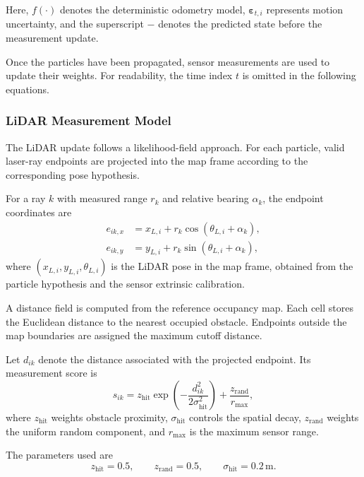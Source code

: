 \documentclass[a4paper,11pt,oneside]{book}
\begin{document}
Here, $f(\cdot)$ denotes the deterministic odometry model,
$\boldsymbol{\varepsilon}_{t,i}$ represents motion uncertainty,
and the superscript $-$ denotes the predicted state before
the measurement update.

Once the particles have been propagated, sensor measurements
are used to update their weights. For readability, the time
index $t$ is omitted in the following equations.

\subsubsection{LiDAR Measurement Model}

The LiDAR update follows a likelihood-field approach. For each
particle, valid laser-ray endpoints are projected into the map
frame according to the corresponding pose hypothesis.

For a ray $k$ with measured range $r_k$ and relative bearing
$\alpha_k$, the endpoint coordinates are
\begin{align}
    e_{ik,x}
    &=
    x_{L,i}
    +
    r_k\cos\left(\theta_{L,i}+\alpha_k\right), \\
    e_{ik,y}
    &=
    y_{L,i}
    +
    r_k\sin\left(\theta_{L,i}+\alpha_k\right),
\end{align}
where $(x_{L,i},y_{L,i},\theta_{L,i})$ is the LiDAR pose in the
map frame, obtained from the particle hypothesis and the
sensor extrinsic calibration.

A distance field is computed from the reference occupancy map.
Each cell stores the Euclidean distance to the nearest occupied
obstacle. Endpoints outside the map boundaries are assigned
the maximum cutoff distance.

Let $d_{ik}$ denote the distance associated with the projected
endpoint. Its measurement score is
\begin{equation}
    s_{ik}
    =
    z_{\mathrm{hit}}
    \exp\left(
        -\frac{d_{ik}^{2}}{2\sigma_{\mathrm{hit}}^{2}}
    \right)
    +
    \frac{z_{\mathrm{rand}}}{r_{\max}},
    \label{eq:lidar_measurement_score}
\end{equation}
where $z_{\mathrm{hit}}$ weights obstacle proximity,
$\sigma_{\mathrm{hit}}$ controls the spatial decay,
$z_{\mathrm{rand}}$ weights the uniform random component,
and $r_{\max}$ is the maximum sensor range.

The parameters used are
\begin{equation}
    z_{\mathrm{hit}}=0.5,
    \qquad
    z_{\mathrm{rand}}=0.5,
    \qquad
    \sigma_{\mathrm{hit}}=0.2\,\mathrm{m}.
\end{equation}
\end{document}
